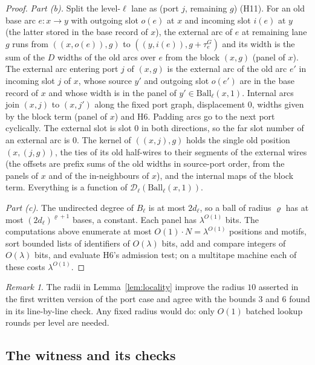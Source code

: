 \documentclass[11pt]{article}
\theoremstyle{definition}
\theoremstyle{remark}
\newtheorem{remark}[theorem]{Remark}
\newcommand{\Ball}{\mathrm{Ball}}
\begin{document}
\begin{proof}
\emph{Part (b).} Split the level-$\ell$ lane as (port $j$, remaining $g$) (H11). For an old base arc $e:x\to y$ with outgoing slot
$o(e)$ at $x$ and incoming slot $i(e)$ at $y$ (the latter stored in the base record of $x$), the external arc of $e$ at remaining
lane $g$ runs from $((x,o(e)),g)$ to $((y,i(e)),g+\tau^G_e)$ and its width is the sum of the $D$ widths of the old arcs over $e$ from
the block $(x,g)$ (panel of $x$). The external arc entering port $j$ of $(x,g)$ is the external arc of the old arc $e'$ in incoming
slot $j$ of $x$, whose source $y'$ and outgoing slot $o(e')$ are in the base record of $x$ and whose width is in the panel of
$y'\in\Ball_\ell(x,1)$. Internal arcs join $(x,j)$ to $(x,j')$ along the fixed port graph, displacement $0$, widths given by the block
term (panel of $x$) and H6. Padding arcs go to the next port cyclically. The external slot is slot $0$ in both directions, so the far
slot number of an external arc is $0$. The kernel of $((x,j),g)$ holds the single old position $(x,(j,g))$, the ties of its old
half-wires to their segments of the external wires (the offsets are prefix sums of the old widths in source-port order, from the
panels of $x$ and of the in-neighbours of $x$), and the internal maps of the block term. Everything is a function of
$\mathcal D_\ell(\Ball_\ell(x,1))$.

\emph{Part (c).} The undirected degree of $B_\ell$ is at most $2d_\ell$, so a ball of radius $\varrho$ has at most
$(2d_\ell)^{\varrho+1}$ bases, a constant. Each panel has $\lambda^{O(1)}$ bits. The computations above enumerate at most
$O(1)\cdot N=\lambda^{O(1)}$ positions and motifs, sort bounded lists of identifiers of $O(\lambda)$ bits, add and compare
integers of $O(\lambda)$ bits, and evaluate H6's admission test; on a multitape machine each of these costs $\lambda^{O(1)}$.
\end{proof}

\begin{remark}
The radii in Lemma~\ref{lem:locality} improve the radius $10$ asserted in the first written version of the port case and agree with the
bounds $3$ and $6$ found in its line-by-line check. Any fixed radius would do: only $O(1)$ batched lookup rounds per level are needed.
\end{remark}

\subsection{The witness and its checks}\label{subsec:witness}
\end{document}
